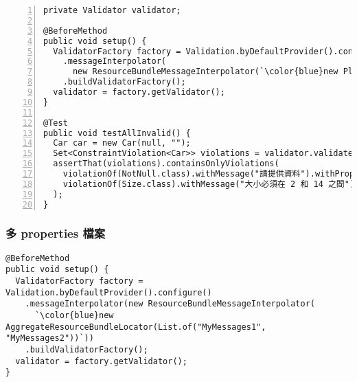 \begin{lstlisting}[numbers=left, basicstyle=\linespread{1}\ttfamily\footnotesize, xleftmargin=1.5\parindent]
private Validator validator;

@BeforeMethod
public void setup() {
  ValidatorFactory factory = Validation.byDefaultProvider().configure()
    .messageInterpolator(
      new ResourceBundleMessageInterpolator(`\color{blue}new PlatformResourceBundleLocator("MyMessages")`))
    .buildValidatorFactory();
  validator = factory.getValidator();
}

@Test
public void testAllInvalid() {
  Car car = new Car(null, "");
  Set<ConstraintViolation<Car>> violations = validator.validate(car);
  assertThat(violations).containsOnlyViolations(
    violationOf(NotNull.class).withMessage("請提供資料").withProperty("manufacturer"),
    violationOf(Size.class).withMessage("大小必須在 2 和 14 之間").withProperty("licensePlate")
  );
}
\end{lstlisting}

\subsubsection{多 properties 檔案}

\begin{lstlisting}
@BeforeMethod
public void setup() {
  ValidatorFactory factory = Validation.byDefaultProvider().configure()
    .messageInterpolator(new ResourceBundleMessageInterpolator(
      `\color{blue}new AggregateResourceBundleLocator(List.of("MyMessages1", "MyMessages2"))`))
    .buildValidatorFactory();
  validator = factory.getValidator();
}
\end{lstlisting}